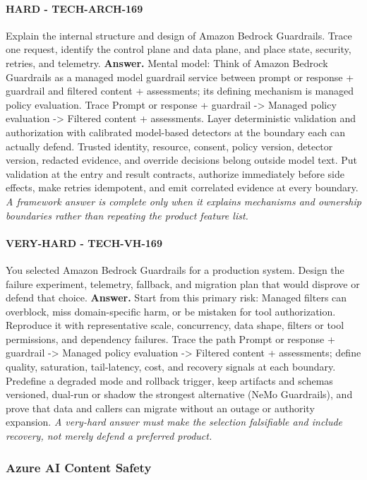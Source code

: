 \paragraph{HARD - TECH-ARCH-169} Explain the internal structure and design of Amazon Bedrock Guardrails. Trace one request, identify the control plane and data plane, and place state, security, retries, and telemetry.
\textbf{Answer.} Mental model: Think of Amazon Bedrock Guardrails as a managed model guardrail service between prompt or response + guardrail and filtered content + assessments; its defining mechanism is managed policy evaluation. Trace Prompt or response + guardrail -> Managed policy evaluation -> Filtered content + assessments. Layer deterministic validation and authorization with calibrated model-based detectors at the boundary each can actually defend. Trusted identity, resource, consent, policy version, detector version, redacted evidence, and override decisions belong outside model text. Put validation at the entry and result contracts, authorize immediately before side effects, make retries idempotent, and emit correlated evidence at every boundary.
\textit{A framework answer is complete only when it explains mechanisms and ownership boundaries rather than repeating the product feature list.}
\paragraph{VERY-HARD - TECH-VH-169} You selected Amazon Bedrock Guardrails for a production system. Design the failure experiment, telemetry, fallback, and migration plan that would disprove or defend that choice.
\textbf{Answer.} Start from this primary risk: Managed filters can overblock, miss domain-specific harm, or be mistaken for tool authorization. Reproduce it with representative scale, concurrency, data shape, filters or tool permissions, and dependency failures. Trace the path Prompt or response + guardrail -> Managed policy evaluation -> Filtered content + assessments; define quality, saturation, tail-latency, cost, and recovery signals at each boundary. Predefine a degraded mode and rollback trigger, keep artifacts and schemas versioned, dual-run or shadow the strongest alternative (NeMo Guardrails), and prove that data and callers can migrate without an outage or authority expansion.
\textit{A very-hard answer must make the selection falsifiable and include recovery, not merely defend a preferred product.}
\subsubsection*{Azure AI Content Safety}
